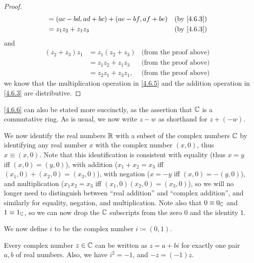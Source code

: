 \begin{proof}
\begin{align*}
                    & = (ac - bd, ad + bc) + (ae - bf, af + be)                 & \text{(by \cref{4.6.3})}  \\
                    & = z_1 z_2 + z_1 z_3                                       & \text{(by \cref{4.6.3})}
  \end{align*}
  and
  \begin{align*}
    (z_2 + z_3) z_1 & = z_1 (z_2 + z_3)    & \text{(from the proof above)} \\
                    & = z_1 z_2 + z_1 z_3  & \text{(from the proof above)} \\
                    & = z_2 z_1 + z_3 z_1, & \text{(from the proof above)}
  \end{align*}
  we know that the multiplication operation in \cref{4.6.5} and the addition operation in \cref{4.6.3} are distributive.
\end{proof}

\begin{note}
  \cref{4.6.6} can also be stated more succinctly, as the assertion that \(\mathbb{C}\) is a commutative ring.
  As is usual, we now write \(z - w\) as shorthand for \(z + (-w)\).
\end{note}

\begin{note}
  We now identify the real numbers \(\mathbb{R}\) with a subset of the complex numbers \(\mathbb{C}\) by identifying any real number \(x\) with the complex number \((x, 0)\), thus \(x \equiv (x, 0)\).
  Note that this identification is consistent with equality (thus \(x = y\) iff \((x, 0) = (y, 0)\)), with addition (\(x_1 + x_2 = x_3\) iff \((x_1, 0) + (x_2, 0) = (x_3, 0)\)), with negation (\(x = -y\) iff \((x, 0) = -(y, 0)\)), and multiplication (\(x_1 x_2 = x_3\) iff \((x_1, 0) (x_2, 0) = (x_3, 0)\)), so we will no longer need to distinguish between ``real addition'' and ``complex addition'', and similarly for equality, negation, and multiplication.
  Note also that \(0 \equiv 0_{\mathbb{C}}\) and \(1 \equiv 1_{\mathbb{C}}\), so we can now drop the \(\mathbb{C}\) subscripts from the zero \(0\) and the identity \(1\).
\end{note}

\begin{note}
  We now define \(i\) to be the complex number \(i \coloneqq (0, 1)\).
\end{note}

\begin{lem}\label{4.6.7}
  Every complex number \(z \in \mathbb{C}\) can be written as \(z = a + bi\) for exactly one pair \(a, b\) of real numbers.
  Also, we have \(i^2 = -1\), and \(-z = (-1)z\).
\end{lem}

